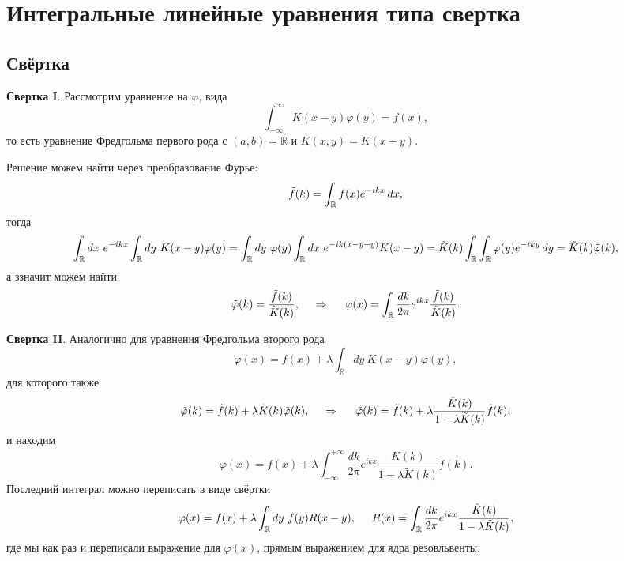 \section{Интегральные линейные уравнения типа свертка}

\subsection*{Свёртка}


\textbf{Свертка I}. Рассмотрим уравнение на $\varphi$, вида
\begin{equation*}
	\int_{-\infty}^{\infty} K(x-y) \varphi(y) = f(x),
\end{equation*}
то есть уравнение Фредгольма первого рода с $(a, b) = \mathbb{R}$
 и $K(x,y) = K(x-y)$. 

Решение можем найти через преобразование Фурье:
\begin{equation*}
	\tilde{f}(k) = \int_{\mathbb{R}} f(x) e^{-ikx} \, d x,
\end{equation*}
тогда
\begin{equation*}
	\int_{\mathbb{R}} dx\ e^{-ikx} \int_{\mathbb{R}} dy\ K(x-y) \varphi(y) = \int_{\mathbb{R}} dy\ \varphi(y) \int_{\mathbb{R}} dx\ e^{-ik(x-y+y)} K(x-y) = \tilde{K} (k) \int_{\mathbb{R}} \int_{\mathbb{R}} \varphi(y) e^{-iky} \d y = \tilde{K}(k) \tilde{\varphi}(k),
\end{equation*}
а ззначит можем найти
\begin{equation}
	\tilde{\varphi}(k) = \frac{\tilde{f}(k)}{\tilde{K}(k)},
	\hspace{0.5cm} \Rightarrow \hspace{0.5cm}
	 \varphi(x) = \int_{\mathbb{R}} \frac{dk}{2\pi} e^{ikx} \frac{\tilde{f}(k)}{\tilde{K}(k)}.
\end{equation}

\textbf{Свертка II}. Аналогично для уравнения Фредгольма второго рода
\begin{equation*}
	\varphi(x) = f(x) + \lambda \int_{\mathbb{R}} dy\ K(x-y) \varphi(y),
\end{equation*}
для которого также
\begin{equation*}
	\tilde{\varphi}(k) = \tilde{f}(k) + \lambda \tilde{K} (k) \tilde{\varphi}(k),
	\hspace{0.5cm} \Rightarrow \hspace{0.5cm}
	\tilde{\varphi}(k) = \tilde{f}(k) + \lambda \frac{\tilde{K}(k)}{1 - \lambda \tilde{K}(k)} \tilde{f}(k), 
\end{equation*}
и находим
\begin{equation*}
	\varphi(x) = f(x) + \lambda \int_{-\infty}^{+\infty} \frac{dk}{2\pi} e^{ikx} \frac{\tilde{K}(k)}{1 - \lambda \tilde{K}(k)} \tilde{f}(k).
\end{equation*}
Последний интеграл можно переписать в виде свёртки
\begin{equation}
	\varphi(x) = f(x) + \lambda \int_{\mathbb{R}} dy\ f(y) R(x-y),
	\hspace{5 mm} 
	R(x) = \int_{\mathbb{R}} \frac{dk}{2\pi} e^{ik x} \frac{\tilde{K}(k)}{1-\lambda \tilde{K}(k)},
\end{equation}
где мы как раз и переписали выражение для $\varphi(x)$, прямым выражением для ядра резовльвенты. 


